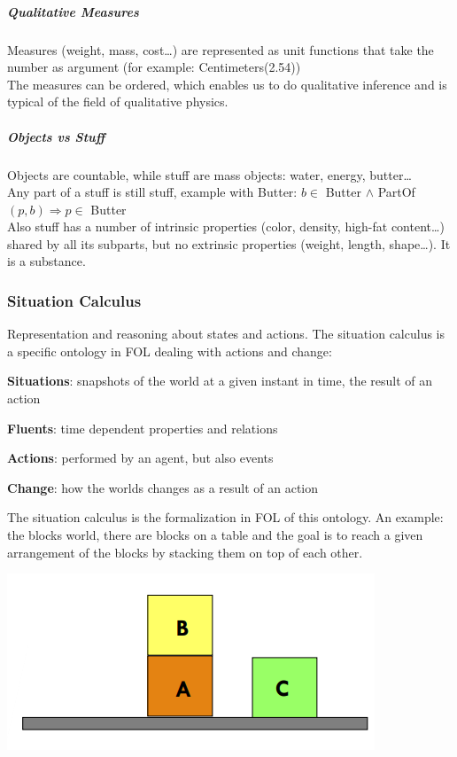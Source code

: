 \documentclass[10pt]{report}
\begin{document}
\subparagraph{Qualitative Measures} Measures (weight, mass, cost\ldots) are represented as unit functions that take the number as argument (for example: Centimeters(2.54))\\
The measures can be ordered, which enables us to do qualitative inference and is typical of the field of qualitative physics.
\subparagraph{Objects vs Stuff} Objects are countable, while stuff are mass objects: water, energy, butter\ldots\\
Any part of a stuff is still stuff, example with Butter: $b\in$ Butter $\wedge$ PartOf$(p,b)\Rightarrow p\in$ Butter\\
Also stuff has a number of intrinsic properties (color, density, high-fat content\ldots) shared by all its subparts, but no extrinsic properties (weight, length, shape\ldots). It is a substance.
\subsubsection{Situation Calculus} Representation and reasoning about states and actions. The situation calculus is a specific ontology in FOL dealing with actions and change:
\begin{list}{}{}
	\item \textbf{Situations}: snapshots of the world at a given instant in time, the result of an action
	\item \textbf{Fluents}: time dependent properties and relations
	\item \textbf{Actions}: performed by an agent, but also events
	\item \textbf{Change}: how the worlds changes as a result of an action
\end{list}
The situation calculus is the formalization in FOL of this ontology. An example: the blocks world, there are blocks on a table and the goal is to reach a given arrangement of the blocks by stacking them on top of each other.
\begin{center}
	\includegraphics[scale=0.75]{13.png}
\end{center}
\end{document}
